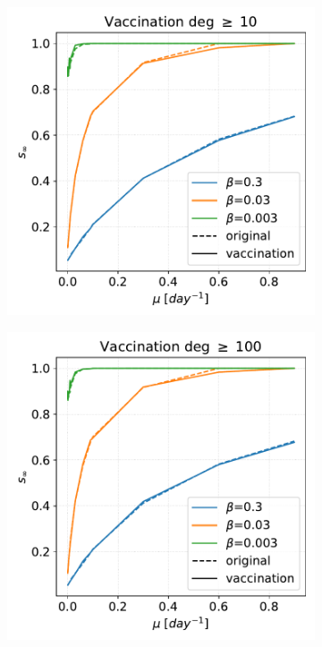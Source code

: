 \documentclass[a4paper,11pt, twocolumn]{article}
\begin{document}
\begin{figure}[t!]
\begin{subfigure}[t]{0.32\textwidth}
\centering
\includegraphics[scale=0.30]{./Figure/SIS/vax_deg_10.pdf}
\caption{}
\end{subfigure}
\begin{subfigure}[t]{0.32\textwidth}
\centering
\includegraphics[scale=0.30]{./Figure/SIS/vax_deg_100.pdf}

\end{subfigure}
\end{figure}
\end{document}
